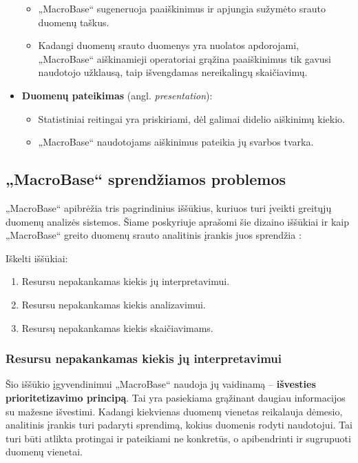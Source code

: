 \documentclass{VUMIFPSbakalaurinis}
\begin{document}
\begin{itemize}
\begin{itemize}
			\item „MacroBase“ sugeneruoja paaiškinimus ir apjungia sužymėto srauto duomenų taškus.
			\item Kadangi duomenų srauto duomenys yra nuolatos apdorojami, „MacroBase“ aiškinamieji operatoriai grąžina paaiškinimus tik gavusi naudotojo užklausą, taip išvengdamas nereikalingų skaičiavimų.
		\end{itemize}
	\item \textbf{Duomenų pateikimas} (angl. \textit{presentation}):
		\begin{itemize}
			\item Statistiniai reitingai yra priskiriami, dėl galimai didelio aiškinimų kiekio.
			\item „MacroBase“ naudotojams aiškinimus pateikia jų svarbos tvarka.
		\end{itemize}
\end{itemize}

\subsection{„MacroBase“ sprendžiamos problemos} \label{subsec:problems}
„MacroBase“ apibrėžia tris pagrindinius iššūkius, kuriuos turi įveikti greitųjų duomenų analizės sistemos. Šiame poskyriuje aprašomi šie dizaino iššūkiai ir kaip „MacroBase“ greito duomenų srauto analitinis įrankis juos sprendžia \cite{prioritizing_attention}:

Iškelti iššūkiai:
\begin{enumerate}
	\item Resursu nepakankamas kiekis jų interpretavimui.
	\item Resursu nepakankamas kiekis analizavimui.
	\item Resursų nepakankamas kiekis skaičiavimams.
\end{enumerate}

\subsubsection{Resursu nepakankamas kiekis jų interpretavimui}
Šio iššūkio įgyvendinimui „MacroBase“ naudoja jų vaidinamą – \textbf{išvesties prioritetizavimo principą}. Tai yra pasiekiama grąžinant daugiau informacijos su mažesne išvestimi. Kadangi kiekvienas duomenų vienetas reikalauja dėmesio, analitinis įrankis turi padaryti sprendimą, kokius duomenis rodyti naudotojui. Tai turi būti atlikta protingai ir pateikiami ne konkretūs, o apibendrinti ir sugrupuoti duomenų vienetai. \par
\end{document}

